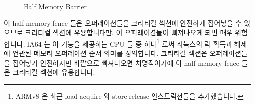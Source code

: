 \begin{figure}[tb]
\begin{center}
\end{center}
\caption{Half Memory Barrier}
\end{figure}

이 half-memory fence 들은 오퍼레이션들을 크리티컬 섹션에 안전하게 집어넣을 수
있으므로 크리티컬 섹션에 유용합니다만, 이 오퍼레이션들이 삐져나오게 되면 매우
위험합니다.
IA64 는 이 기능을 제공하는 CPU 들 중 하나\footnote{
	ARMv8 은 최근 load-acquire 와 store-release 인스트럭션들을
	추가했습니다.}
로써 리눅스의 락 획득과 해제에 연관된 메모리 오퍼레이션 순서 의미를 정의합니다.
크리티컬 섹션은 오퍼레이션들을 집어넣기 안전하지만 바깥으로 삐져나오면
치명적이기에 이 half-memory fence 들은 크리티컬 섹션에 유용합니다.

